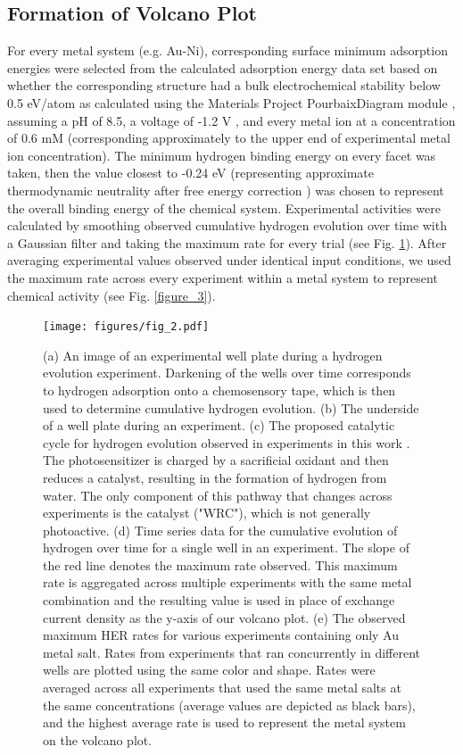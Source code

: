 \documentclass[preprint,12pt]{elsarticle}
\begin{document}
\subsection{Formation of Volcano Plot}\label{Section:Experimental/Volcano}
For every metal system (e.g. Au-Ni), corresponding surface minimum adsorption energies were selected from the calculated adsorption energy data set based on whether the corresponding structure had a bulk electrochemical stability below 0.5 eV/atom as calculated using the Materials Project PourbaixDiagram module \cite{singh2017electrochemical,persson2012prediction,patel2019efficient}, assuming a pH of 8.5, a voltage of -1.2 V \cite{lowry2005single}, and every metal ion at a concentration of 0.6 mM (corresponding approximately to the upper end of experimental metal ion concentration). The minimum hydrogen binding energy on every facet was taken, then the value closest to -0.24 eV (representing approximate thermodynamic neutrality after free energy correction \cite{norskov2005trends}) was chosen to represent the overall binding energy of the chemical system. Experimental activities were calculated by smoothing observed cumulative hydrogen evolution over time with a Gaussian filter and taking the maximum rate for every trial (see Fig. \ref{figure_2}). After averaging experimental values observed under identical input conditions, we used the maximum rate across every experiment within a metal system to represent chemical activity (see Fig. \ref{figure_3}). 

\begin{figure}[h]
\centering
    \texttt{[image: figures/fig\_2.pdf]}
\caption{(a) An image of an experimental well plate during a hydrogen evolution experiment. Darkening of the wells over time corresponds to hydrogen adsorption onto a chemosensory tape, which is then used to determine cumulative hydrogen evolution. (b) The underside of a well plate during an experiment. (c) The proposed catalytic cycle for hydrogen evolution observed in experiments in this work \cite{lopato2020parallelized}. The photosensitizer is charged by a sacrificial oxidant and then reduces a catalyst, resulting in the formation of hydrogen from water. The only component of this pathway that changes across experiments is the catalyst ("WRC"), which is not generally photoactive. (d) Time series data for the cumulative evolution of hydrogen over time for a single well in an experiment. The slope of the red line denotes the maximum rate observed. This maximum rate is aggregated across multiple experiments with the same metal combination and the resulting value is used in place of exchange current density as the y-axis of our volcano plot. (e) The observed maximum HER rates for various experiments containing only Au metal salt. Rates from experiments that ran concurrently in different wells are plotted using the same color and shape. Rates were averaged across all experiments that used the same metal salts at the same concentrations (average values are depicted as black bars), and the highest average rate is used to represent the metal system on the volcano plot.
}
\label{figure_2}
\end{figure}
\end{document}

